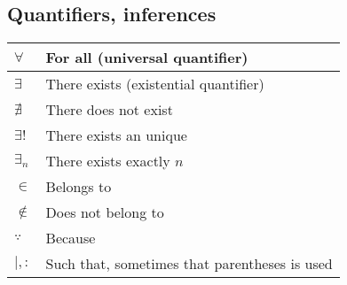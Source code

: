 \documentclass{article}
\begin{document}
\subsection{Quantifiers, inferences}
\begin{xltabular}{\textwidth}{XX}
	\(\forall\)                  & For all (universal quantifier) \cite{grahamConcreteMathematicsFoundation1989}                                                                                                                                \\ \hline
	\(\exists\)                  & There exists (existential quantifier) \cite{grahamConcreteMathematicsFoundation1989}                                                                                                                         \\ \hline
	\(\nexists\)                 & There does not exist \cite{grahamConcreteMathematicsFoundation1989}                                                                                                                                          \\ \hline
	\(\exists!\)                 & There exists an unique \cite{grahamConcreteMathematicsFoundation1989}                                                                                                                                         \\ \hline
	\(\exists_{n}\)              & There exists exactly \(n\) \cite{rosenDiscreteMathematicsIts2011}                                                                                                                                         \\ \hline
	\(\in\)                      & Belongs to \cite{grahamConcreteMathematicsFoundation1989}                                                                                                                                                    \\ \hline
	\(\not\in\)                  & Does not belong to \cite{grahamConcreteMathematicsFoundation1989}                                                                                                                                            \\ \hline
	\(\because\)                 & Because \cite{grahamConcreteMathematicsFoundation1989}                                                                                                                                                       \\ \hline
	\(\mid, :\)                  & Such that, sometimes that parentheses is used \cite{grahamConcreteMathematicsFoundation1989}                                                                                                                 \\ \hline

\end{xltabular}
\end{document}
